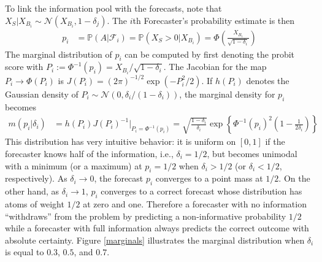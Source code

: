 \documentclass[12pt]{article}
\renewcommand{\P}{\mathbb{P}}
\theoremstyle{definition}
\theoremstyle{definition}
\def\one{\mathbbm{1}}
\def\P{{\mathbb P}}
\begin{document}
To link the information pool with the forecasts, note that $X_S | X_{B_i} \sim \mathcal{N}\left(X_{B_i}, 1-\delta_j\right)$. The $i$th Forecaster's probability estimate is then
\begin{align}
p_i &= \P\left(A | \mathcal{F}_{i}\right) = \P\left(X_S > 0 | X_{B_i}\right) = \Phi\left( \frac{X_{B_i}}{\sqrt{1-\delta_i}}\right) \label{indFore}
\end{align}
The marginal distribution of $p_i$ can be computed by first denoting the probit score with $P_{i} := \Phi^{-1}(p_i) = X_{B_i}/\sqrt{1-\delta_i}$. The Jacobian for the map $P_{i} \to \Phi(P_i)$ is $J(P_i) = (2\pi)^{-1/2} \exp \left( - P_i^2/2   \right)$. If $h(P_i)$ denotes the Gaussian density of $P_i \sim \mathcal{N}\left(0, \delta_i / (1-\delta_i)\right)$, 
the marginal density for $p_i$ becomes
\begin{align*}
 m\left(p_i | \delta_i \right) &= h(P_i) J(P_i)^{-1} \bigg|_{P_i = \Phi^{-1}(p_i)} = \sqrt{\frac{1-\delta_i}{\delta_i}} \exp 
   \left\{ \Phi^{-1}(p_i)^2 \left(1-\frac{1}{2 \delta_i} \right) \right\} 
\end{align*}
This distribution has very intuitive behavior: it is uniform on $[0,1]$ if the forecaster knows half of the
information, i.e.,  $\delta_i = 1/2$, but becomes 
unimodal with a minimum (or a maximum) at $p_i = 1/2$ when $\delta_i > 1/2$ (or $\delta_i < 1/2$, respectively).  As $\delta_i \to 0$, the forecast $p_i$ converges to a point mass at $1/2$. On the other hand, as $\delta_i \to 1$, $p_i$ converges to
a correct forecast whose distribution has atoms of weight $1/2$ at
zero and one. Therefore a forecaster with no information ``withdraws'' from the problem by predicting a non-informative probability $1/2$ while a forecaster with full information always predicts the correct outcome with absolute certainty. Figure \ref{marginals} illustrates the marginal
distribution when $\delta_i$ is equal to $0.3$, $0.5$, and $0.7$.

%
\end{document}
